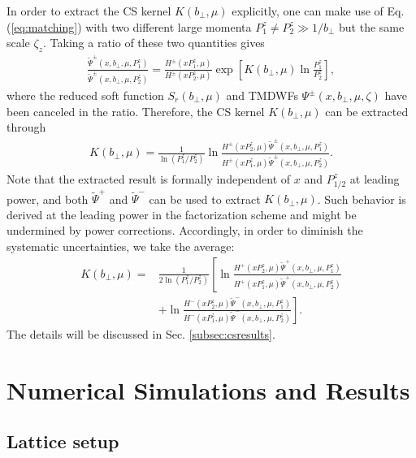 \documentclass[prd,aps,twocolumn,preprintnumbers, showpacs, nofootinbib,superscriptaddress,notitlepage]{revtex4-1}
\newcommand\bl{\color{blue}}
\begin{document}
In order to extract the CS kernel $K\left(b_{\perp}, \mu\right)$ explicitly, one  can make use of    Eq.(\ref{eq:matching}) with  two different large {\bl momenta}  $P_1^z\neq P_2^z\gg1/b_{\perp}$ but the same   scale $\zeta_z$. Taking a  ratio of these two quantities  gives 
\begin{align}
	\frac{\tilde \Psi^{\pm}(x, b_{\perp}, \mu,P_1^z)}{\tilde \Psi^{\pm}(x, b_{\perp}, \mu, P_2^z)}=\frac{H^{\pm}\left(xP_1^z,\mu \right)}{H^{\pm}\left(xP_2^z,\mu \right)}\exp\left[K(b_{\perp},\mu) \ln\frac{P_1^z}{P_2^z}\right], \label{eq:ratioofquasiWF}
\end{align}
where the reduced soft function $S_r(b_{\perp},\mu)$ and TMDWFs $\Psi^{\pm}(x,b_{\perp},\mu,\zeta)$  have been canceled in the ratio. Therefore, the CS kernel $K\left(b_{\perp}, \mu\right)$ can be extracted through 
\begin{align}
	K\left(b_{\perp}, \mu\right)=\frac{1}{\ln(P_1^z/P_2^z)} \ln\frac{H^{\pm}(xP_2^z,\mu)\tilde{\Psi}^{\pm}(x,b_{\perp},\mu,P_1^z)}{H^{\pm}(xP_1^z,\mu)\tilde{\Psi}^{\pm}(x,b_{\perp},\mu,P_2^z)}. \label{eq:extractingCSkernel}
\end{align}
Note that the extracted result is formally independent of $x$ and $P_{1/2}^z$ at leading power,  and both $\tilde{\Psi}^{+}$ and $\tilde{\Psi}^{-}$ can be used to {\bl extract} $K\left(b_{\perp}, \mu\right)$.  Such behavior is derived at the leading power in the factorization scheme and  might be undermined by power corrections. Accordingly, in order  to diminish  the systematic uncertainties,  we {\bl take} the average: 
 \begin{align}
	K\left(b_{\perp}, \mu\right)=&\frac{1}{2\ln(P_1^z/P_2^z)} \left[\ln\frac{H^{+}(xP_2^z,\mu)\tilde{\Psi}^{+}(x,b_{\perp},\mu,P_1^z)}{H^{+}(xP_1^z,\mu)\tilde{\Psi}^{+}(x,b_{\perp},\mu,P_2^z)}\right.  \nonumber\\
	&+\left.\ln\frac{H^{-}(xP_2^z,\mu)\tilde{\Psi}^{-}(x,b_{\perp},\mu,P_1^z)}{H^{-}(xP_1^z,\mu)\tilde{\Psi}^{-}(x,b_{\perp},\mu,P_2^z)}\right].
\end{align}
The details will be discussed in Sec. \ref{subsec:csresults}.

\section{Numerical Simulations and Results}
\label{sec:numerics}

\subsection{Lattice setup }
\end{document}
